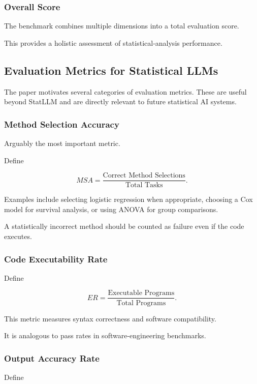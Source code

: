 \documentclass[11pt]{article}
\begin{document}
\subsubsection*{Overall Score}

The benchmark combines multiple dimensions into a total evaluation score.

This provides a holistic assessment of statistical-analysis performance.

\subsection*{Evaluation Metrics for Statistical LLMs}

The paper motivates several categories of evaluation metrics. These are useful beyond StatLLM and are directly relevant to future statistical AI systems.

\subsubsection*{Method Selection Accuracy}

Arguably the most important metric.

Define

\[MSA=\frac{\text{Correct Method Selections}}{\text{Total Tasks}}.\]

Examples include selecting logistic regression when appropriate, choosing a Cox model for survival analysis, or using ANOVA for group comparisons.

A statistically incorrect method should be counted as failure even if the code executes.

\subsubsection*{Code Executability Rate}

Define

\[ER=\frac{\text{Executable Programs}}{\text{Total Programs}}.\]

This metric measures syntax correctness and software compatibility.

It is analogous to pass rates in software-engineering benchmarks.

\subsubsection*{Output Accuracy Rate}

Define
\end{document}
